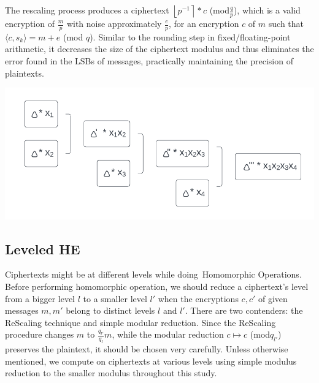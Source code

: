 \documentclass{article}
\begin{document}
\noindent The rescaling process produces a ciphertext $\left\lfloor p^{-1}\right\rceil * c $ (mod$ \frac{q}{p}$), which is a valid encryption of $\frac{m}{p}$ with noise approximately $\frac{e}{p}$, for an encryption $c$ of $m$ such that $\langle c, s_k \rangle = m + e$ (mod $q$). Similar to the rounding step in fixed/floating-point arithmetic, it decreases the size of the ciphertext modulus and thus eliminates the error found in the LSBs of messages, practically maintaining the precision of plaintexts.

\begin{center}
    \includegraphics[scale = 0.75]{Blank diagram (2).png}
\end{center}

\subsection{Leveled HE}


\noindent Ciphertexts might be at different levels while doing Homomorphic Operations. Before performing homomorphic operation, we should reduce a ciphertext's level from a bigger level $l$ to a smaller level $l'$ when the encryptions $c, c'$ of given messages $m, m'$ belong to distinct levels $l$ and $l'$. There are two contenders: the ReScaling technique and simple modular reduction. Since the ReScaling procedure changes $m$ to $\frac{q_{l'}}{q_l} m$, while the modular reduction $c \mapsto c$ (mod$ q_{l'}$) preserves the plaintext, it should be chosen very carefully. Unless otherwise mentioned, we compute on ciphertexts at various levels using simple modulus reduction to the smaller modulus throughout this study.
\\
\end{document}
